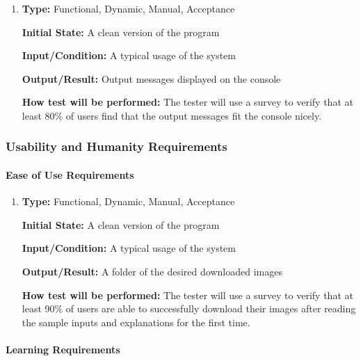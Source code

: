 \documentclass[12pt, titlepage]{article}
\begin{document}
\begin{enumerate}[label=NFR-AR\arabic*:, wide=0pt, leftmargin=*]

\item \phantom{empty}

\textbf{Type:} Functional, Dynamic, Manual, Acceptance
					
\textbf{Initial State:} A clean version of the program
					
\textbf{Input/Condition:} A typical usage of the system
					
\textbf{Output/Result:} Output messages displayed on the console
					
\textbf{How test will be performed:} The tester will use a survey to verify that at least 80\% of users find that the output messages fit the console nicely.

\end{enumerate}

\subsubsection{Usability and Humanity Requirements}
\label{UaHReqs}
		
\paragraph{Ease of Use Requirements}

\begin{enumerate}[label=NFR-EUR\arabic*:, wide=0pt, leftmargin=*]

\item \phantom{empty}

\textbf{Type:} Functional, Dynamic, Manual, Acceptance
					
\textbf{Initial State:} A clean version of the program
					
\textbf{Input/Condition:} A typical usage of the system
					
\textbf{Output/Result:} A folder of the desired downloaded images
					
\textbf{How test will be performed:} The tester will use a survey to verify that at least 90\% of users are able to successfully download their images after reading the sample inputs and explanations for the first time.

\end{enumerate}

\paragraph{Learning Requirements}
\end{document}

